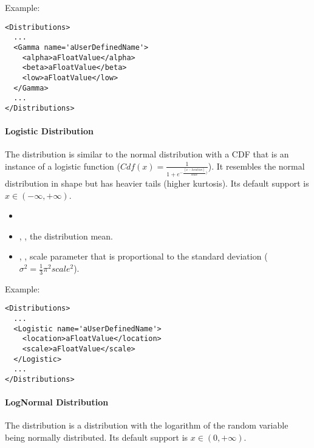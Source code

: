 Example:
\begin{lstlisting}[style=XML]
<Distributions>
  ...
  <Gamma name='aUserDefinedName'>
    <alpha>aFloatValue</alpha>
    <beta>aFloatValue</beta>
    <low>aFloatValue</low>
  </Gamma>
  ...
</Distributions>
\end{lstlisting}

\paragraph{Logistic Distribution}
\label{Logistic}
The  distribution is similar to the
normal distribution with a CDF that is an instance of a logistic function ($Cdf(x) = \frac{1}{1+e^{-\frac{(x-location)}{scale})}}$).
%
It resembles the normal distribution in shape but has heavier tails (higher
kurtosis).
%
Its default support is $x \in (-\infty,+\infty)$.

%
\attrIntro
\vspace{-5mm}
\begin{itemize}
  \itemsep0em
  \item \nameDescription
\end{itemize}
\vspace{-5mm}
\subnodesIntro
\begin{itemize}
  \item {}, , the
  distribution
  mean.
  \item {}, , scale parameter
  that
  is proportional to the standard deviation ($\sigma ^{2}=\frac{1}{3}\pi^{2}scale^{2} $).
\end{itemize}

Example:
\begin{lstlisting}[style=XML]
<Distributions>
  ...
  <Logistic name='aUserDefinedName'>
    <location>aFloatValue</location>
    <scale>aFloatValue</scale>
  </Logistic>
  ...
</Distributions>
\end{lstlisting}

\paragraph{LogNormal Distribution}
\label{LogNormal}
The  distribution is a distribution with the
logarithm of the random variable being normally distributed.
%
Its default support is $x \in (0, +\infty)$.

